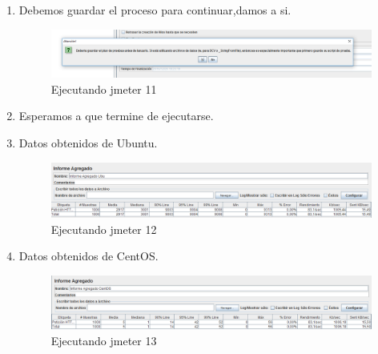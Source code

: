 \begin{enumerate}
	\item Debemos guardar el proceso para continuar,damos a si.
	
	\begin{figure}[H] %
		\centering
		\includegraphics[scale=0.3]{pics/11}  %
		\caption{Ejecutando jmeter 11} \label{fig:jmt11}
	\end{figure}

	\item Esperamos a que termine de ejecutarse.

	\item Datos obtenidos de Ubuntu.

	\begin{figure}[H] %
		\centering
		\includegraphics[scale=0.3]{pics/12}  %
		\caption{Ejecutando jmeter 12} \label{fig:jmt12}
	\end{figure}

	\item Datos obtenidos de CentOS.

	\begin{figure}[H] %
		\centering
		\includegraphics[scale=0.3]{pics/13}  %
		\caption{Ejecutando jmeter 13} \label{fig:jmt13}
	\end{figure}


\end{enumerate}
